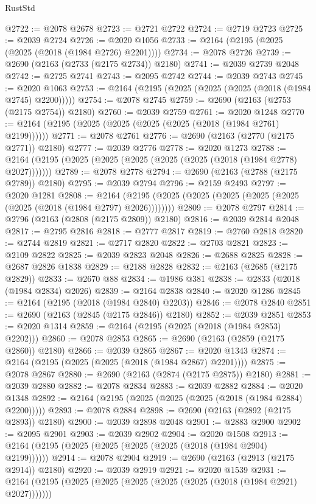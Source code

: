 \begin{lexlean}{RustStd}
\begin{coremodule}
@2722 := @2078 @2678
@2723 := @2721 @2722
@2724 := @2719 @2723
@2725 := @2039 @2724
@2726 := @2020 @1056
@2733 := @2164 (@2195 (@2025 (@2025 (@2018 (@1984 @2726) @2201))))
@2734 := @2078 @2726
@2739 := @2690 (@2163 (@2733 (@2175 @2734)) @2180)
@2741 := @2039 @2739 @2048
@2742 := @2725 @2741
@2743 := @2095 @2742
@2744 := @2039 @2743
@2745 := @2020 @1063
@2753 := @2164 (@2195 (@2025 (@2025 (@2025 (@2018 (@1984 @2745) @2200)))))
@2754 := @2078 @2745
@2759 := @2690 (@2163 (@2753 (@2175 @2754)) @2180)
@2760 := @2039 @2759
@2761 := @2020 @1248
@2770 := @2164 (@2195 (@2025 (@2025 (@2025 (@2025 (@2018 (@1984 @2761) @2199))))))
@2771 := @2078 @2761
@2776 := @2690 (@2163 (@2770 (@2175 @2771)) @2180)
@2777 := @2039 @2776
@2778 := @2020 @1273
@2788 := @2164 (@2195 (@2025 (@2025 (@2025 (@2025 (@2025 (@2018 (@1984 @2778) @2027)))))))
@2789 := @2078 @2778
@2794 := @2690 (@2163 (@2788 (@2175 @2789)) @2180)
@2795 := @2039 @2794
@2796 := @2159 @2493
@2797 := @2020 @1281
@2808 := @2164 (@2195 (@2025 (@2025 (@2025 (@2025 (@2025 (@2025 (@2018 (@1984 @2797) @2026))))))))
@2809 := @2078 @2797
@2814 := @2796 (@2163 (@2808 (@2175 @2809)) @2180)
@2816 := @2039 @2814 @2048
@2817 := @2795 @2816
@2818 := @2777 @2817
@2819 := @2760 @2818
@2820 := @2744 @2819
@2821 := @2717 @2820
@2822 := @2703 @2821
@2823 := @2109 @2822
@2825 := @2039 @2823 @2048
@2826 := @2688 @2825
@2828 := @2687 @2826 @1838
@2829 := @2188 @2828
@2832 := @2163 (@2685 (@2175 @2829))
@2833 := @2670 @88
@2834 := @1986 @381
@2838 := @2833 (@2018 (@1984 @2834) @2026)
@2839 := @2164 @2838
@2840 := @2020 @1286
@2845 := @2164 (@2195 (@2018 (@1984 @2840) @2203))
@2846 := @2078 @2840
@2851 := @2690 (@2163 (@2845 (@2175 @2846)) @2180)
@2852 := @2039 @2851
@2853 := @2020 @1314
@2859 := @2164 (@2195 (@2025 (@2018 (@1984 @2853) @2202)))
@2860 := @2078 @2853
@2865 := @2690 (@2163 (@2859 (@2175 @2860)) @2180)
@2866 := @2039 @2865
@2867 := @2020 @1343
@2874 := @2164 (@2195 (@2025 (@2025 (@2018 (@1984 @2867) @2201))))
@2875 := @2078 @2867
@2880 := @2690 (@2163 (@2874 (@2175 @2875)) @2180)
@2881 := @2039 @2880
@2882 := @2078 @2834
@2883 := @2039 @2882
@2884 := @2020 @1348
@2892 := @2164 (@2195 (@2025 (@2025 (@2025 (@2018 (@1984 @2884) @2200)))))
@2893 := @2078 @2884
@2898 := @2690 (@2163 (@2892 (@2175 @2893)) @2180)
@2900 := @2039 @2898 @2048
@2901 := @2883 @2900
@2902 := @2095 @2901
@2903 := @2039 @2902
@2904 := @2020 @1508
@2913 := @2164 (@2195 (@2025 (@2025 (@2025 (@2025 (@2018 (@1984 @2904) @2199))))))
@2914 := @2078 @2904
@2919 := @2690 (@2163 (@2913 (@2175 @2914)) @2180)
@2920 := @2039 @2919
@2921 := @2020 @1539
@2931 := @2164 (@2195 (@2025 (@2025 (@2025 (@2025 (@2025 (@2018 (@1984 @2921) @2027)))))))

\end{coremodule}
\end{lexlean}
